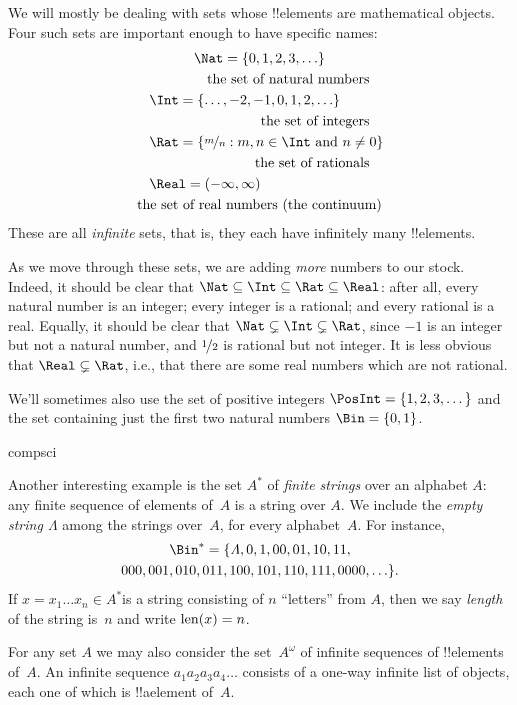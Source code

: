 \documentclass[../../../include/open-logic-section]{subfiles}
\begin{document}

\begin{ex}
We will mostly be dealing with sets whose !!{element}s are
mathematical objects. Four such sets are important enough to have
specific names:
\begin{multline*}
    \Nat = \{0, 1, 2, 3, \ldots\} \\
    \shoveright{\text{the set of natural numbers}}\\
    \shoveleft{\Int = \{\ldots, -2, -1, 0, 1, 2, \ldots\}} \\
    \shoveright{\text{the set of integers}}\\
    \shoveleft{\Rat = \Setabs{\nicefrac{m}{n}}{m, n \in \Int\text{ and }n \neq 0}}\\
    \shoveright{\text{the set of rationals}}\\
    \shoveleft{\Real = (-\infty, \infty)}\\
    \text{the set of real numbers (the continuum)}
\end{multline*}
These are all \emph{infinite} sets, that is, they each have
infinitely many !!{element}s.

As we move through these sets, we are adding \emph{more} numbers to
our stock. Indeed, it should be clear that $\Nat \subseteq \Int
\subseteq \Rat \subseteq \Real$: after all, every natural number is an
integer; every integer is a rational; and every rational is a real.
Equally, it should be clear that $\Nat \subsetneq \Int \subsetneq
\Rat$, since $-1$ is an integer but not a natural number, and
$\nicefrac{1}{2}$ is rational but not integer. It is less obvious
that $\Real \subsetneq \Rat$, i.e., that there are some real numbers
which are not rational. 

We'll sometimes also use the set of positive integers $\PosInt = \{1,
2, 3, \dots\}$ and the set containing just the first two natural
numbers $\Bin = \{0, 1\}$.
\end{ex}

\begin{tagblock}{compsci}
\begin{ex}[Strings] 
Another interesting example  is the set $A^{*}$ of \emph{finite
strings} over an alphabet $A$: any finite sequence of elements of~$A$
is a string over $A$. We include the \emph{empty string $\Lambda$}
among the strings over~$A$, for every alphabet~$A$. For instance,
\begin{multline*}
\Bin^*
=\{\Lambda,0,1,00,01,10,11,\\
000,001,010,011,100,101,110,111,0000,\ldots\}.
\end{multline*}
If $x=x_{1}\ldots x_{n}\in A^{*}$is a string consisting of $n$
``letters'' from $A$, then we say \emph{length} of the string is~$n$
and write $\mathrm{len}(x)=n$.
\end{ex}
\end{tagblock}

\begin{ex}
For any set $A$ we may also consider the set~$A^\omega$ of infinite
sequences of !!{element}s of~$A$. An infinite sequence
$a_1a_2a_3a_4\dots$ consists of a one-way infinite list of objects,
each one of which is !!a{element} of~$A$.
\end{ex}
\end{document}
